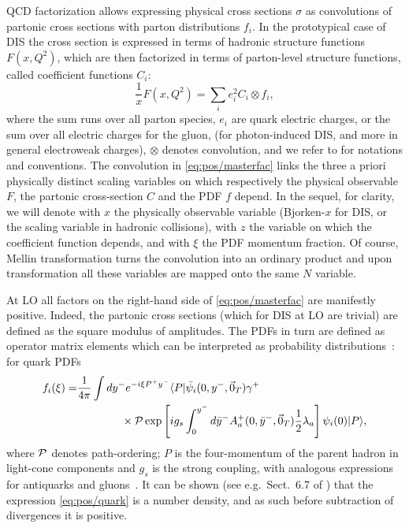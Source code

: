 
QCD factorization allows expressing physical cross sections $\sigma$  as
convolutions of partonic cross sections with parton distributions $f_i$. 
In the prototypical case of DIS the cross section is expressed in terms of
hadronic structure functions $F(x,Q^2)$, which are then factorized in terms of
parton-level structure functions, called coefficient functions $C_i$:
\begin{equation}
  \label{eq:pos/masterfac}
 \frac{1}{x} F(x,Q^2)=\sum_{i} e^2_i C_i \otimes f_i ,
\end{equation}
where the sum runs over all parton species, $e_i$ are quark electric charges,
or the sum over all electric charges for the gluon, (for photon-induced DIS,
and more in general electroweak charges), $\otimes$ denotes convolution, and we
refer to \cite{Ellis:1991qj} for notations and conventions. 
The convolution in \cref{eq:pos/masterfac} links the three a priori physically
distinct scaling variables on which respectively the physical observable $F$,
the partonic cross-section $C$ and the PDF $f$ depend.
In the sequel, for
clarity, we will denote with $x$ the physically observable variable
(Bjorken-$x$ for DIS, or the scaling variable in hadronic collisions), with $z$
the variable on which the coefficient function depends, and with $\xi$ the PDF
momentum fraction.
Of course, Mellin transformation turns the convolution into an ordinary product
and upon transformation all these variables are mapped onto the same $N$
variable. 
 
At LO all factors on the right-hand side of \cref{eq:pos/masterfac} are
manifestly positive.
Indeed, the partonic cross sections (which for DIS at LO are trivial) are
defined as the square modulus of amplitudes. 
The PDFs in turn are defined as operator matrix elements which can be
interpreted as probability distributions~\cite{Collins:1981uw,Curci:1980uw}:
for quark PDFs~\cite{Collins:1981uw}  
\begin{align}
    \label{eq:pos/quark}
    f_i(\xi)=
    &\frac{1}{4\pi}\int dy^- e^{-i \xi P^+ y^-}
    \langle P| \bar \psi_i(0,y^-,\vec 0_T)\gamma^+
    \nonumber\\ 
    &\qquad\qquad
    \times{\cal P} \exp\left[ i g_s \int_0^{y^-} d
    \bar y^- A_a^+(0,\bar y^-,\vec 0_T)\frac{1}{2} \lambda_a\right] \psi_i(0) |P\rangle ,
\end{align}
where ${\cal P}$ denotes path-ordering; $P$ is the four-momentum of
the parent hadron in light-cone components and $g_s$ is the strong
coupling, with analogous expressions for antiquarks and
gluons~\cite{Collins:1981uw}.  It can be shown (see
e.g.\ Sect.~6.7 of \cite{Collins:2011zzd}) that the expression
\cref{eq:pos/quark} is a number density, and as such before
subtraction of divergences it is positive.

